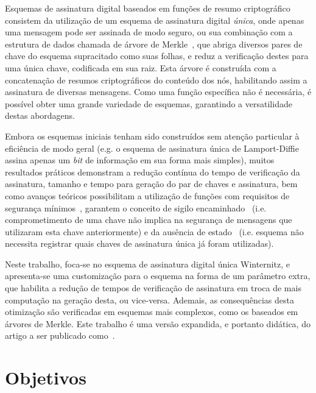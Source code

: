 \documentclass[12pt]{report}
\begin{document}
Esquemas de assinatura digital baseados em funções de resumo criptográfico
consistem da utilização de um esquema de assinatura digital \emph{única},
onde apenas uma mensagem pode ser assinada de modo seguro,
ou sua combinação com a estrutura de dados chamada de árvore de
Merkle~\cite{Merkle:1989:CDS:118209.118230}, que abriga diversos pares de chave do
esquema supracitado como suas folhas, e reduz a verificação destes para uma
única chave, codificada em sua raiz. Esta árvore é construída com a
concatenação de resumos criptográficos do conteúdo dos nós, habilitando assim a
assinatura de diversas mensagens. Como uma função específica não é necessária,
é possível obter uma grande variedade de esquemas, garantindo a versatilidade
destas abordagens.

Embora os esquemas iniciais tenham sido construídos sem atenção particular à
eficiência de modo geral (e.g. o esquema de assinatura única de Lamport-Diffie
\cite{Lamport1979} assina apenas um \emph{bit} de informação em sua forma mais
simples), muitos resultados práticos demonstram a redução contínua do tempo de
verificação da assinatura, tamanho e tempo para geração do par de chaves e
assinatura, bem como avanços teóricos possibilitam a utilização de funções com
requisitos de segurança mínimos~\cite{cryptoeprint:2017:965},
garantem o conceito de sigilo encaminhado~\cite{Buchmann:2011:XPF:2184003.2184011}
(i.e. comprometimento de uma chave não
implica na segurança de mensagens que utilizaram esta chave anteriormente) e da
ausência de estado~\cite{Bernstein2015} (i.e. esquema não necessita registrar
quais chaves de assinatura única já foram utilizadas).

Neste trabalho, foca-se no esquema de assinatura digital única Winternitz, e
apresenta-se uma customização para o esquema na forma de um parâmetro extra,
que habilita a redução de tempos de verificação de assinatura em troca de
mais computação na geração desta, ou vice-versa. Ademais, as consequências
desta otimização são verificadas em esquemas mais complexos, como os baseados
em árvores de Merkle. Este trabalho é uma versão expandida, e portanto didática,
do artigo a ser publicado como~\cite{Peri1806:Tuning}.

\section{Objetivos}
\end{document}
